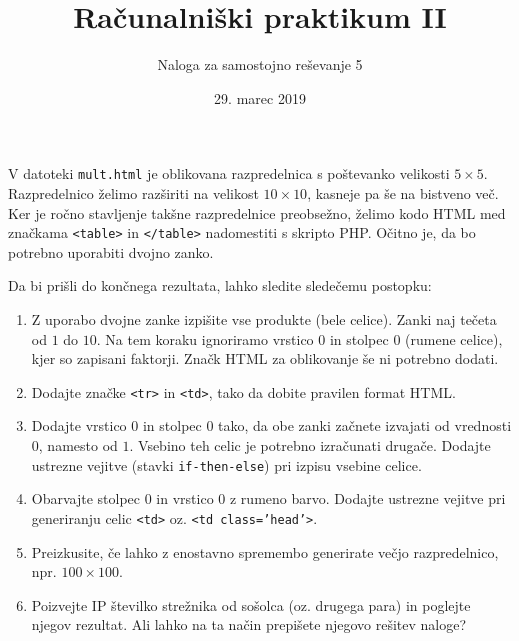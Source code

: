 \documentclass[a4paper,12pt]{article}
\title{Računalniški praktikum II}
\author{Naloga za samostojno reševanje 5}
\date{29. marec 2019}
\begin{document}
\maketitle
\thispagestyle{empty}

\noindent
V datoteki \texttt{mult.html} je oblikovana razpredelnica s poštevanko velikosti $5 \times 5$. Razpredelnico želimo razširiti na velikost $10 \times 10$, kasneje pa še na bistveno več. Ker je ročno stavljenje takšne razpredelnice preobsežno, želimo kodo HTML med značkama \texttt{<table>} in \texttt{</table>} nadomestiti s skripto PHP. Očitno je, da bo potrebno uporabiti dvojno zanko.

\bigskip\noindent
Da bi prišli do končnega rezultata, lahko sledite sledečemu postopku:
\begin{enumerate}
	\item Z uporabo dvojne zanke izpišite vse produkte (bele celice). Zanki naj tečeta od $1$ do $10$. Na tem koraku ignoriramo vrstico $0$ in stolpec $0$ (rumene celice), kjer so zapisani faktorji. Značk HTML za oblikovanje še ni potrebno dodati.
	\item Dodajte značke \texttt{<tr>} in \texttt{<td>}, tako da dobite pravilen format HTML.
	\item Dodajte vrstico $0$ in stolpec $0$ tako, da obe zanki začnete izvajati od vrednosti $0$, namesto od $1$. Vsebino teh celic je potrebno izračunati drugače. Dodajte ustrezne vejitve (stavki \texttt{if-then-else}) pri izpisu vsebine celice.
	\item Obarvajte stolpec $0$ in vrstico $0$ z rumeno barvo. Dodajte ustrezne vejitve pri generiranju celic \texttt{<td>} oz. \texttt{<td class='head'>}.
	\item Preizkusite, če lahko z enostavno spremembo generirate večjo razpredelnico, npr. $100 \times 100$.
	\item Poizvejte IP številko strežnika od sošolca (oz. drugega para) in poglejte njegov rezultat. Ali lahko na ta način prepišete njegovo rešitev naloge?
\end{enumerate}
\end{document}
